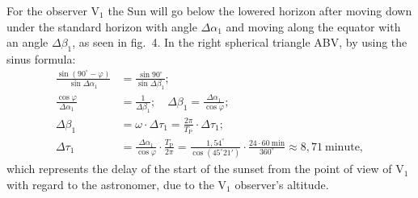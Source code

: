 \begin{description}
  For the observer $\mathrm{V}_1$ the Sun will go below the lowered horizon
  after moving down under the standard horizon with angle $\Delta\alpha_1$
  and moving along the equator with an angle $\Delta\beta_1$, as seen in
  fig.~4.
  In the right spherical triangle ABV, by using the sinus formula:
  \begin{align*}
  \frac{\sin(90^\circ - \varphi)}{\sin\Delta\alpha_1}
    &= \frac{\sin 90^\circ}{\sin\Delta\beta_1};\\
  \frac{\cos\varphi}{\Delta\alpha_1} &= \frac{1}{\Delta\beta_1};\quad
    \Delta\beta_1 = \frac{\Delta\alpha_1}{\cos\varphi};\\
  \Delta\beta_1 &= \omega\cdot\Delta\tau_1
    = \frac{2\pi}{T_{\mathrm{P}}}\cdot\Delta\tau_1;\\
  \Delta\tau_1 &= \frac{\Delta\alpha_1}{\cos\varphi}\cdot
      \frac{T_{\mathrm{P}}}{2\pi}
    = \frac{1{,}54^\circ}{\cos(45^\circ 21')}\cdot
      \frac{24\cdot 60\ \mathrm{min}}{360^\circ}
    \approx 8{,}71\ \mathrm{minute},
  \end{align*}
  which represents the delay of the start of the sunset from the point of
  view of $\mathrm{V}_1$ with regard to the astronomer, due to the
  $\mathrm{V}_1$ observer's altitude.


\end{description}
